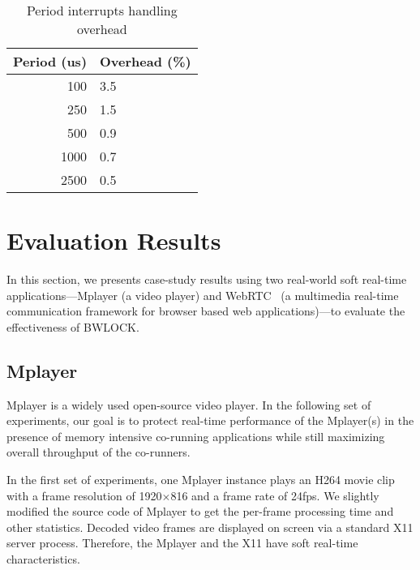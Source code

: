 \documentclass[times, 10pt,onecolumn]{article}
\newcommand{\bottomrule}{\hline}
\newcommand{\toprule}{\hline}
\newcommand{\midrule}{\hline}
\begin{document}
\begin{table}
\centering
\begin{tabular}{rl}
\toprule
Period (us) & Overhead (\%) \\
\midrule
100 & 3.5 \\
250 & 1.5 \\
500 & 0.9 \\
1000 & 0.7 \\
2500 & 0.5 \\
\bottomrule
\end{tabular}
\caption{Period interrupts handling overhead}
\label{tbl:overhead-period}
\end{table}

\section{Evaluation Results} \label{sec:casestudy}

In this section, we presents case-study results using two real-world
soft real-time applications---Mplayer (a video player) and
WebRTC~\cite{webrtc} (a multimedia real-time communication framework
for browser based web applications)---to evaluate the effectiveness
of BWLOCK.

\subsection{Mplayer}

Mplayer is a widely used open-source video player. In the following
set of experiments, our goal is to protect real-time performance of the
Mplayer(s) in the presence of memory intensive co-running applications
while still maximizing overall throughput of the co-runners.

In the first set of experiments, one Mplayer instance plays an H264
movie clip with a frame resolution of 1920$\times$816 and a frame rate
of 24fps. We slightly modified the source code of Mplayer to get the
per-frame processing time and other statistics.
Decoded video frames are displayed on screen via a standard
X11 server process. Therefore, the Mplayer and the X11 have soft
real-time characteristics.
\end{document}
